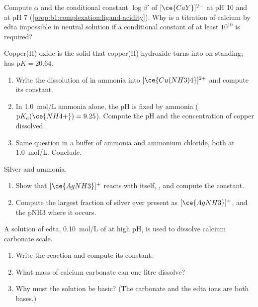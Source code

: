 \begin{exercise}[$\star\star$]\label{exo:b1:complexation:9}
Compute $\alpha$ and the conditional constant $\log\beta'$ of $[\ce{CaY}]^{2-}$
at pH 10 and at pH 7 (\cref{prop:b1:complexation:ligand-acidity}). Why is
a titration of calcium by edta impossible in neutral solution if a
conditional constant of at least $10^{10}$ is required?
\end{exercise}

\begin{exercise}[$\star\star\star$]\label{exo:b1:complexation:10}
Copper(II) oxide  is the solid that copper(II) hydroxide turns into
on standing;  has $\mathrm{p}K = 20.64$.
\begin{enumerate}
  \item Write the dissolution of  in ammonia into
        $[\ce{Cu(NH3)4}]^{2+}$ and compute its constant.
  \item In \qty{1.0}{mol/L} ammonia alone, the pH is fixed by ammonia
        ($\mathrm{p}K_a(\ce{NH4+}) = 9.25$). Compute the pH and the
        concentration of copper dissolved.
  \item Same question in a buffer of ammonia and ammonium chloride, both
        at \qty{1.0}{mol/L}. Conclude.
\end{enumerate}
\end{exercise}

\begin{exercise}[$\star\star\star$]\label{exo:b1:complexation:11}
Silver and ammonia.
\begin{enumerate}
  \item Show that $[\ce{AgNH3}]^{+}$ reacts with itself,
        , and compute the constant.
  \item Compute the largest fraction of silver ever present as
        $[\ce{AgNH3}]^{+}$, and the pNH3 where it occurs.
\end{enumerate}
\end{exercise}

\begin{exercise}[$\star\star\star$]\label{exo:b1:complexation:12}
A solution of edta, \qty{0.10}{mol/L} of  at high pH, is used to
dissolve calcium carbonate scale.
\begin{enumerate}
  \item Write the reaction and compute its constant.
  \item What mass of calcium carbonate can one litre dissolve?
  \item Why must the solution be basic? (The carbonate and the edta ions
        are both bases.)
\end{enumerate}
\end{exercise}

